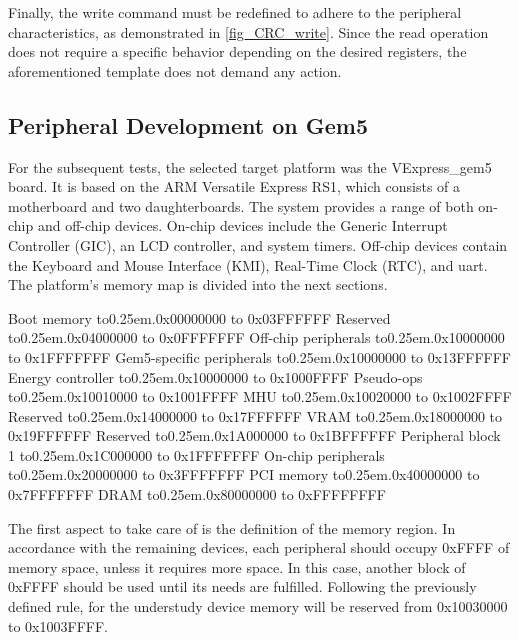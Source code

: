 Finally, the write command must be redefined to adhere to the peripheral characteristics, as demonstrated in \autoref{fig_CRC_write}.
Since the read operation does not require a specific behavior depending on the desired registers, the aforementioned template does not demand any
action.   


\subsection{Peripheral Development on Gem5}

For the subsequent tests, the selected target platform was the VExpress\_gem5 board. It is based on the ARM Versatile Express RS1, which 
consists of a motherboard and two daughterboards. The system provides a range of both on-chip and off-chip devices.
On-chip devices include the Generic Interrupt Controller (GIC), an LCD controller, and system timers.
Off-chip devices contain the Keyboard and Mouse Interface (KMI), Real-Time Clock (RTC), and \gls{uart}. 
The platform's memory map is divided into the next sections.

\def\mydots{\xleaders\hbox to0.25em{\hfill.\hfill}\hfill}

\begin{outline}[enumerate]
	\1 Boot memory 						\mydots 	0x00000000 to 0x03FFFFFF
	\1 Reserved							\mydots 	0x04000000 to 0x0FFFFFFF
	\1 Off-chip peripherals				\mydots 	0x10000000 to 0x1FFFFFFF
		\2 Gem5-specific peripherals	\mydots 	0x10000000 to 0x13FFFFFF
			\3 Energy controller 		\mydots 	0x10000000 to 0x1000FFFF
			\3 Pseudo-ops				\mydots		0x10010000 to 0x1001FFFF
			\3 MHU						\mydots		0x10020000 to 0x1002FFFF
		\2 Reserved 					\mydots 	0x14000000 to 0x17FFFFFF
		\2 VRAM							\mydots		0x18000000 to 0x19FFFFFF
		\2 Reserved 					\mydots		0x1A000000 to 0x1BFFFFFF
		\2 Peripheral block 1			\mydots		0x1C000000 to 0x1FFFFFFF
	\1 On-chip  peripherals				\mydots 	0x20000000 to 0x3FFFFFFF
	\1 PCI memory 						\mydots 	0x40000000 to 0x7FFFFFFF
	\1 DRAM								\mydots 	0x80000000 to 0xFFFFFFFF
\end{outline}

The first aspect to take care of is the definition of the memory region. In accordance with the remaining devices, each peripheral should 
occupy 0xFFFF of memory space, unless it requires more space. In this case, another block of 0xFFFF should be used until its needs are fulfilled. 
Following the previously defined rule, for the understudy device memory will be reserved from 0x10030000 to 0x1003FFFF.

